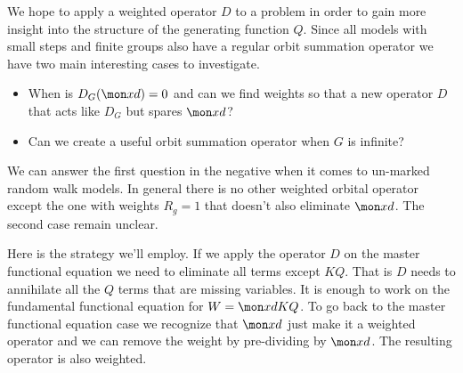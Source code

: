 We hope to apply a weighted operator $D$ to a problem in order to gain more insight into the structure of the generating function $Q$. Since all models with small steps and finite groups also have a regular orbit summation operator we have two main interesting cases to investigate.
\begin{itemize}
\item[(1)] When is $D_G(\mon xd) = 0$ and can we find weights so that a new operator $D$ that acts like $D_G$ but spares $\mon xd$?
\item[(2)] Can we create a useful orbit summation operator when $G$ is infinite?
\end{itemize}
We can answer the first question in the negative when it comes to un-marked random walk models. In general there is no other weighted orbital operator except the one with weights $R_g = 1$ that doesn't also eliminate $\mon xd$. The second case remain unclear.

Here is the strategy we'll employ. If we apply the operator $D$ on the master functional equation we need to eliminate all terms except $KQ$. That is $D$ needs to annihilate all the $Q$ terms that are missing variables. It is enough to work on the fundamental functional equation for $W = \mon xd KQ$. To go back to the master functional equation case we recognize that $\mon xd$ just make it a weighted operator and we can remove the weight by pre-dividing by $\mon xd$. The resulting operator is also weighted.

